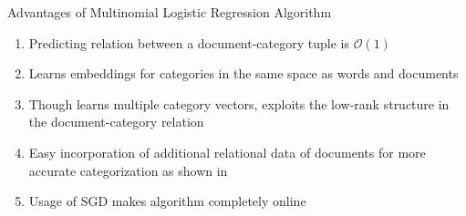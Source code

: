 \documentclass[10pt]{beamer}
\begin{document}

\begin{frame}{Advantages of Multinomial Logistic Regression Algorithm }

\begin{enumerate}
	\vfill\item<1-> Predicting relation between a document-category tuple is $\mathcal{O}(1)$
	\vfill\item<2-> Learns embeddings for categories in the same space as words and documents
	\vfill\item<3-> Though learns multiple category vectors, exploits the low-rank structure in the document-category relation
	\vfill\item<4-> Easy incorporation of additional relational data of documents for more accurate categorization as shown in \citet{gupta2015collectively}
	\vfill\item<5-> Usage of SGD makes algorithm completely online
\end{enumerate}
\end{frame}

\end{document}
